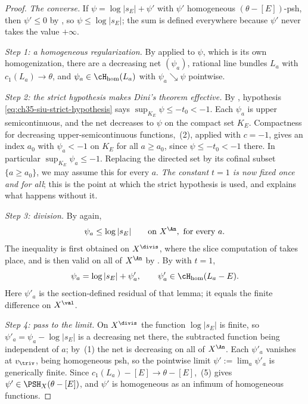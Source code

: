\begin{proof}
\emph{The converse.}  If $\psi=\log|s_E|+\psi'$ with $\psi'$ homogeneous
$(\theta-[E])$-psh, then $\psi'\leq0$ by
, so $\psi\leq\log|s_E|$; the
sum is defined everywhere because $\psi'$ never takes the value
$+\infty$.

\medskip
\noindent\emph{Step 1: a homogeneous regularization.}
By  applied to $\psi$, which is its own
homogenization, there are a decreasing net $(\psi_a)$, rational line
bundles $L_a$ with $c_1(L_a)\to\theta$, and
$\psi_a\in\cH_{\mathrm{hom}}(L_a)$ with $\psi_a\searrow\psi$
pointwise.

\medskip
\noindent\emph{Step 2: the strict hypothesis makes Dini's theorem
effective.}
By , hypothesis
\eqref{eq:ch35-siu-strict-hypothesis} says $\sup_{K_E}\psi\leq-t_0<-1$.
Each $\psi_a$ is upper semicontinuous, and the net decreases to $\psi$
on the compact set $K_E$. Compactness for decreasing upper-semicontinuous
functions, \,(2), applied with $c=-1$, gives an
index $a_0$ with $\psi_a<-1$ on $K_E$ for all $a\geq a_0$, since
$\psi\leq-t_0<-1$ there. In particular $\sup_{K_E}\psi_a\leq-1$.  Replacing the directed
set by its cofinal subset $\{a\geq a_0\}$, we may assume this for every
$a$.  \emph{The constant $t=1$ is now fixed once and for all}; this is
the point at which the strict hypothesis is used, and
 explains what happens without it.

\medskip
\noindent\emph{Step 3: division.}
By  again,
\begin{equation}
\label{eq:ch35-siu-slice-bound}
 \psi_a\leq\log|s_E|
 \qquad\text{on }X^{\An},\text{ for every }a .
\end{equation}
The inequality is first obtained on $X^{\divis}$, where the slice
computation of  takes place, and is then valid
on all of $X^{\An}$ by .  By  with
$t=1$,
\[
 \psi_a=\log|s_E|+\psi'_a,
 \qquad\psi'_a\in\cH_{\mathrm{hom}}(L_a-E).
\]
Here $\psi'_a$ is the section-defined residual of that lemma; it equals
the finite difference on $X^{\val}$.

\medskip
\noindent\emph{Step 4: pass to the limit.}
On $X^{\divis}$ the function $\log|s_E|$ is finite, so
$\psi'_a=\psi_a-\log|s_E|$ is a decreasing net there, the subtracted
function being independent of $a$; by
\,(1) the net is decreasing on all
of $X^{\An}$.  Each $\psi'_a$ vanishes at $v_{\triv}$, being
homogeneous psh, so the pointwise limit
$\psi':=\lim_a\psi'_a$ is generically finite.  Since
$c_1(L_a)-[E]\to\theta-[E]$, \,(5) gives
$\psi'\in\PSH_X(\theta-[E])$, and $\psi'$ is homogeneous as an infimum
of homogeneous functions.


\end{proof}
